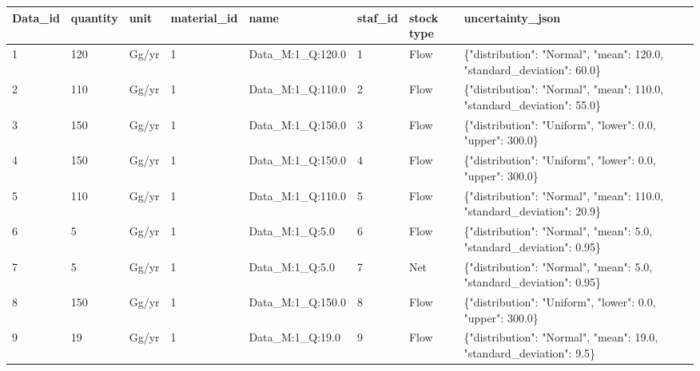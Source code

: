 \documentclass[ %
                    author={Tom Jager},
                supervisor={Dr. Daniel Schien},
                    degree={MEng},
                     title={A Bayesian Inference Engine for Calibrating Uncertainty over UMIS Structured MFA Systems},
                  subtitle={},
                      type={research},
                      year={2019} ]{dissertation}
\begin{document}
\begin{table}[]
\scriptsize
\begin{tabular}{|l|l|l|l|l|l|p{1.1cm}|p{5cm}|}
\hline
\textbf{Data\_id} & \textbf{quantity} & \textbf{unit} & \textbf{material\_id} & \textbf{name}      & \textbf{staf\_id} & \textbf{stock type} & \textbf{uncertainty\_json}                                               \\ \hline
1                 & 120               & Gg/yr         & 1                     & Data\_M:1\_Q:120.0 & 1                 & Flow                 & \{"distribution": "Normal", "mean": 120.0, "standard\_deviation": 60.0\} \\ \hline
2                 & 110               & Gg/yr         & 1                     & Data\_M:1\_Q:110.0 & 2                 & Flow                 & \{"distribution": "Normal", "mean": 110.0, "standard\_deviation": 55.0\} \\ \hline
3                 & 150               & Gg/yr         & 1                     & Data\_M:1\_Q:150.0 & 3                 & Flow                 & \{"distribution": "Uniform", "lower": 0.0, "upper": 300.0\}              \\ \hline
4                 & 150               & Gg/yr         & 1                     & Data\_M:1\_Q:150.0 & 4                 & Flow                 & \{"distribution": "Uniform", "lower": 0.0, "upper": 300.0\}              \\ \hline
5                 & 110               & Gg/yr         & 1                     & Data\_M:1\_Q:110.0 & 5                 & Flow                 & \{"distribution": "Normal", "mean": 110.0, "standard\_deviation": 20.9\} \\ \hline
6                 & 5                 & Gg/yr         & 1                     & Data\_M:1\_Q:5.0   & 6                 & Flow                 & \{"distribution": "Normal", "mean": 5.0, "standard\_deviation": 0.95\}   \\ \hline
7                 & 5                 & Gg/yr         & 1                     & Data\_M:1\_Q:5.0   & 7                 & Net                  & \{"distribution": "Normal", "mean": 5.0, "standard\_deviation": 0.95\}   \\ \hline
8                 & 150               & Gg/yr         & 1                     & Data\_M:1\_Q:150.0 & 8                 & Flow                 & \{"distribution": "Uniform", "lower": 0.0, "upper": 300.0\}              \\ \hline
9                 & 19                & Gg/yr         & 1                     & Data\_M:1\_Q:19.0  & 9                 & Flow                 & \{"distribution": "Normal", "mean": 19.0, "standard\_deviation": 9.5\}   \\ \hline

\end{tabular}
\end{table}
\end{document}
